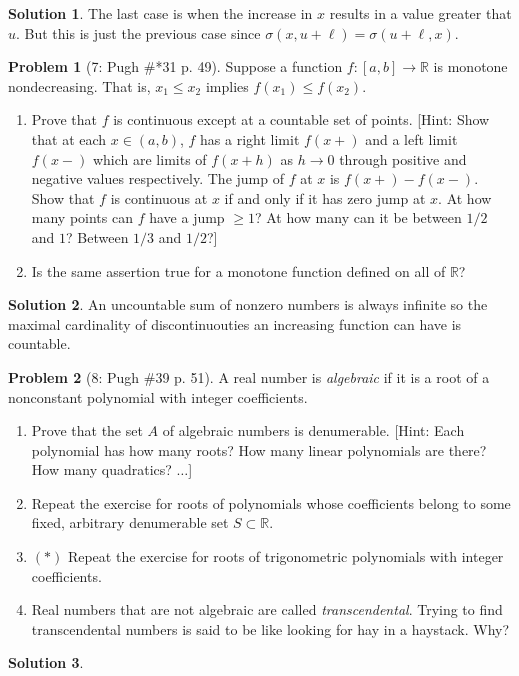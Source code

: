 \documentclass{article}
\theoremstyle{definition}
\newtheorem*{soln}{Solution}
\newtheorem*{prob}{Problem}
\theoremstyle{theorem}
\newcommand{\R}{\mathbb{R}}
\begin{document}
\begin{soln}
    The last case is when the increase in $x$ results in a value greater that $u$. But this is just the previous case since $\sigma(x,u+\ell) = \sigma(u+\ell,x)$.

\end{soln}
\vspace{1in}


\begin{prob}[7: Pugh \#*31 p. 49]
Suppose a function $f: [a,b] \to \R$ is monotone nondecreasing. That is, $x_1 \leq x_2$ implies $f(x_1) \leq f(x_2)$.
\begin{enumerate}
    \item Prove that $f$ is continuous except at a countable set of points. [Hint: Show that at each $x \in (a,b)$, $f$ has a right limit $f(x+)$ and a left limit $f(x-)$ which are limits of $f(x+h)$ as $h \to 0$ through positive and negative values respectively. The jump of $f$ at $x$ is $f(x+) - f(x-).$ Show that $f$ is continuous at $x$ if and only if it has zero jump at $x$. At how many points can $f$ have a jump $\geq 1$? At how many can it be between $1/2$ and $1$? Between $1/3$ and $1/2$?]
    \item Is the same assertion true for a monotone function defined on all of $\R$?
\end{enumerate}
\end{prob}
\begin{soln}
        An uncountable sum of nonzero numbers is always infinite so the maximal cardinality of discontinuouties an increasing function can have is countable.

\end{soln}
\vspace{1in}


\begin{prob}[8: Pugh \#39 p. 51]
A real number is \emph{algebraic} if it is a root of a nonconstant polynomial with integer coefficients.
\begin{enumerate}
    \item Prove that the set $A$ of algebraic numbers is denumerable. [Hint: Each polynomial has how many roots? How many linear polynomials are there? How many quadratics? $\ldots$]
    \item Repeat the exercise for roots of polynomials whose coefficients belong to some fixed, arbitrary denumerable set $S \subset \R$.
    \item $(*)$ Repeat the exercise for roots of trigonometric polynomials with integer coefficients.
    \item Real numbers that are not algebraic are called \emph{transcendental}. Trying to find transcendental numbers is said to be like looking for hay in a haystack. Why?
\end{enumerate}
\end{prob}
\begin{soln}

\end{soln}
\vspace{1in}
\end{document}
